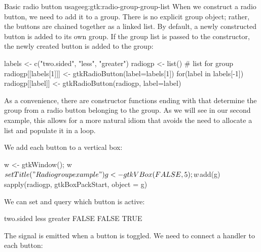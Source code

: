 \begin{example}{Basic radio button usage}{eg:gtk:radio-group-group-list} 
  When we construct a radio button, we need to add it to a
  group. There is no explicit group object; rather, the buttons are
  chained together as a linked list. By default, a newly constructed
  button is added to its own group. If the group list is passed to the
  constructor, the newly created button is added to the group:
\begin{Schunk}
\begin{Sinput}
 labels <- c("two.sided", "less", "greater")
 radiogp <- list()                           # list for group
 radiogp[[labels[1]]] <- gtkRadioButton(label=labels[1]) 
 for(label in labels[-1]) 
   radiogp[[label]] <- gtkRadioButton(radiogp, label=label)
\end{Sinput}
\end{Schunk}
%
As a convenience, there are constructor functions ending with
 that determine the group from a radio button
belonging to the group. As we will see in our second example, this
allows for a more natural  idiom that avoids the need
to allocate a list and populate it in a  loop.

We add each button to a vertical box:
\begin{Schunk}
\begin{Sinput}
 w <- gtkWindow(); w$setTitle("Radio group example")
 g <- gtkVBox(FALSE, 5); w$add(g)
 sapply(radiogp, gtkBoxPackStart, object = g)
\end{Sinput}
\end{Schunk}

We can set and query which button is active:
\begin{Schunk}
\begin{Sinput}
 g[[3]]$setActive(TRUE)           
 sapply(radiogp, `[`, "active") 
\end{Sinput}
\begin{Soutput}
two.sided      less   greater 
    FALSE     FALSE      TRUE 
\end{Soutput}
\end{Schunk}

The  signal is emitted when a button is toggled. We need
to connect a handler to each button:
\begin{Schunk}
\end{Schunk}
\end{example}

